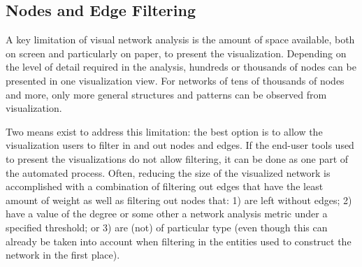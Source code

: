 \subsection{Nodes and Edge Filtering}

A key limitation of visual network analysis is the amount of space available, both on screen and particularly on paper, to present the visualization. Depending on the level of detail required in the analysis, hundreds or thousands of nodes can be presented in one visualization view. For networks of tens of thousands of nodes and more, only more general structures and patterns can be observed from visualization. 

Two means exist to address this limitation: the best option is to allow the visualization users to filter in and out nodes and edges. If the end-user tools used to present the visualizations do not allow filtering, it can be done as one part of the automated process. Often, reducing the size of the visualized network is accomplished with a combination of filtering out edges that have the least amount of weight as well as filtering out nodes that: 1) are left without edges; 2) have a value of the degree or some other a network analysis metric under a specified threshold; or 3) are (not) of particular type (even though this can already be taken into account when filtering in the entities used to construct the network in the first place).

